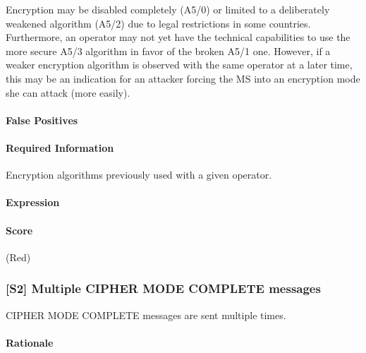 \documentclass[a4paper,11pt,notitlepage,bigheadings,oneside]{scrartcl}
\begin{document}
Encryption may be disabled completely (A5/0) or limited to a deliberately
weakened algorithm (A5/2) due to legal restrictions in some countries.
Furthermore, an operator may not yet have the technical capabilities to use the
more secure A5/3 algorithm in favor of the broken A5/1 one. However, if a
weaker encryption algorithm is observed with the same operator at a later time,
this may be an indication for an attacker forcing the MS into an encryption
mode she can attack (more easily).

\paragraph{False Positives}

\TBD


\paragraph{Required Information}

Encryption algorithms previously used with a given operator.


\paragraph{Expression}

\TBD

\paragraph{Score}

\TBD{} (Red)

\subsubsection{[S2] Multiple CIPHER MODE COMPLETE messages}

CIPHER MODE COMPLETE messages are sent multiple times.

\paragraph{Rationale}

\TBD
\end{document}
